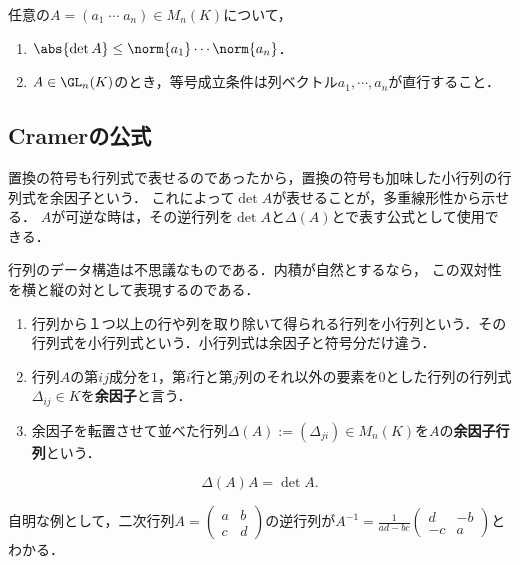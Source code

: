 \documentclass[uplatex, dvipdfmx]{jsreport}
\begin{document}
\begin{proposition}[Hadamardの不等式]
    任意の$A=(a_1\;\cdots\;a_n)\in M_n(K)$について，
    \begin{enumerate}
        \item $\abs{\det A}\le\norm{a_1}\cdots\norm{a_n}$．
        \item $A\in\GL_n(K)$のとき，等号成立条件は列ベクトル$a_1,\cdots,a_n$が直行すること．
    \end{enumerate}
\end{proposition}

\subsection{Cramerの公式}

\begin{tcolorbox}[colframe=ForestGreen, colback=ForestGreen!10!white, breakable]
    置換の符号も行列式で表せるのであったから，置換の符号も加味した小行列の行列式を余因子という．
    これによって$\det A$が表せることが，多重線形性から示せる．
    $A$が可逆な時は，その逆行列を$\det A$と$\Delta(A)$とで表す公式として使用できる．

    行列のデータ構造は不思議なものである．内積が自然とするなら，
    この双対性を横と縦の対として表現するのである．
\end{tcolorbox}

\begin{definition}\mbox{}
    \begin{enumerate}
        \item 行列から１つ以上の行や列を取り除いて得られる行列を小行列という．その行列式を小行列式という．小行列式は余因子と符号分だけ違う．
        \item 行列$A$の第$ij$成分を$1$，第$i$行と第$j$列のそれ以外の要素を$0$とした行列の行列式$\Delta_{ij}\in K$を\textbf{余因子}と言う．
        \item 余因子を転置させて並べた行列$\Delta(A):=(\Delta_{ji})\in M_n(K)$を$A$の\textbf{余因子行列}という．
    \end{enumerate}
\end{definition}

\begin{proposition}[Cramer]\label{prop-Cramer}
    \[\Delta(A)A=\det A.\]
\end{proposition}

\begin{example}
    自明な例として，二次行列$A=\begin{pmatrix}a&b\\c&d\end{pmatrix}$の逆行列が$A^{-1}=\frac{1}{ad-bc}\begin{pmatrix}d&-b\\-c&a\end{pmatrix}$とわかる．
\end{example}
\end{document}
